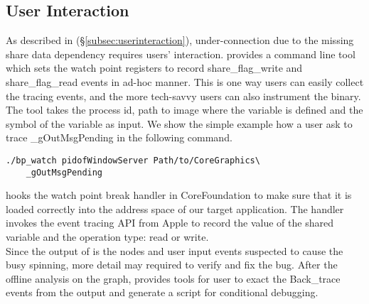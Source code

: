 
\subsection{User Interaction}\label{subsec:tcp}

As described in (\S\ref{subsec:userinteraction}), under-connection due
to the missing share data dependency requires users' interaction. \xxx
provides a command line tool which sets the watch point registers to record
share\_flag\_write and share\_flag\_read events in ad-hoc manner. This is one
way users can easily collect the tracing events, and the more tech-savvy users
can also instrument the binary. The tool takes the process id, path to image
where the variable is defined and the symbol of the variable as input. We
show the simple example how a user ask \xxx to trace \_gOutMsgPending in the
following command.

\begin{lstlisting}
./bp_watch pidofWindowServer Path/to/CoreGraphics\
	_gOutMsgPending
\end{lstlisting}

\xxx hooks the watch point break handler in CoreFoundation to make sure that it is
loaded correctly into the address space of our target application. The handler
invokes the event tracing API from Apple to record the value of the shared
variable and the operation type: read or write.
\\
Since the output of \xxx is the nodes and user input events suspected to cause
the busy spinning, more detail may required to verify and fix the bug. After
the offline analysis on the graph, \xxx provides tools for user to exact
the Back\_trace events from the output and generate a script for conditional
debugging.

